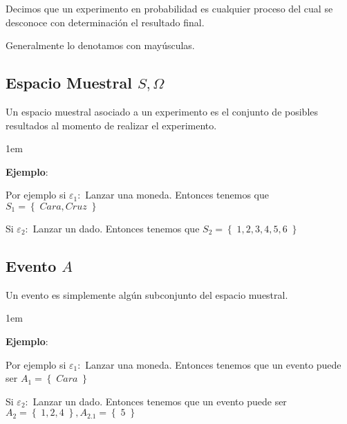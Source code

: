 \documentclass[12pt, fleqn]{report}                             %
\newenvironment{SmallIndentation}[1][0.75em]                    %
        {\begin{adjustwidth}{#1}{}\begin{footnotesize}}             %
        {\end{footnotesize}\end{adjustwidth}}                       %
\theoremstyle{break}                                            %
\newcommand{\Set}[1]{\left\{ \; #1 \; \right\}}                 %
\begin{document}
                Decimos que un experimento en probabilidad es cualquier proceso del cual se desconoce
                con determinación el resultado final.

                Generalmente lo denotamos con mayúsculas.



            \vspace{1em}
            \subsection{Espacio Muestral $S, \Omega$}

                Un espacio muestral asociado a un experimento es el conjunto de posibles resultados al
                momento de realizar el experimento.

                 \begin{SmallIndentation}[1em]
                     \textbf{Ejemplo}:
                     
                    Por ejemplo si $\varepsilon_1:$ Lanzar una moneda.
                    Entonces tenemos que $S_1 = \Set{Cara, Cruz}$ 

                    Si $\varepsilon_2:$ Lanzar un dado.
                    Entonces tenemos que $S_2 = \Set{1, 2, 3, 4, 5, 6}$ 
                 
                 \end{SmallIndentation}


            \vspace{1em}
            \subsection{Evento $A$}

                Un evento es simplemente algún subconjunto del espacio muestral.

                 \begin{SmallIndentation}[1em]
                     \textbf{Ejemplo}:
                     
                    Por ejemplo si $\varepsilon_1:$ Lanzar una moneda.
                    Entonces tenemos que un evento puede ser $A_1 = \Set{Cara}$ 

                    Si $\varepsilon_2:$ Lanzar un dado.
                    Entonces tenemos que un evento puede ser $A_2 = \Set{1, 2, 4}, A_2.1 = \Set{5}$ 
                 
                 \end{SmallIndentation}
\end{document}
